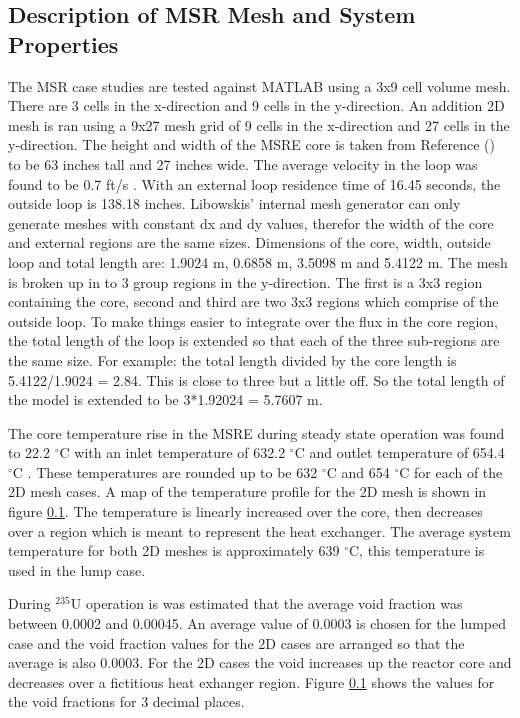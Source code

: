 \subsection{Description of MSR Mesh and System Properties}
The MSR case studies are tested against MATLAB using a 3x9 cell volume mesh. There are 3 cells in the x-direction and 9 cells in the y-direction. An addition 2D mesh is ran using a 9x27 mesh grid of 9 cells in the x-direction and 27 cells in the y-direction. The height and width of the MSRE core is taken from Reference (\cite{haubenreich1964}) to be 63 inches tall and 27 inches wide. The average velocity in the loop was found to be 0.7 ft/s \cite{kedl1972}. With an external loop residence time of 16.45 seconds, the outside loop is 138.18 inches. Libowskis' internal mesh generator can only generate meshes with constant dx and dy values, therefor the width of the core and external regions are the same sizes. Dimensions of the core, width, outside loop and total length are: 1.9024 m, 0.6858 m, 3.5098 m and 5.4122 m. The mesh is broken up in to 3 group regions in the y-direction. The first is a 3x3 region containing the core, second and third are two 3x3 regions which comprise of the outside loop. To make things easier to integrate over the flux in the core region, the total length of the loop is extended so that each of the three sub-regions are the same size. For example: the total length divided by the core length is 5.4122/1.9024 = 2.84. This is close to three but a little off. So the total length of the model is extended to be 3*1.92024 = 5.7607 m. 

The core temperature rise in the MSRE during steady state operation was found to 22.2 $^{\circ}$C with an inlet temperature of 632.2 $^{\circ}$C and outlet temperature of 654.4 $^{\circ}$C \cite{engel1962}. These temperatures are rounded up to be 632 $^{\circ}$C and 654 $^{\circ}$C for each of the 2D mesh cases. A map of the temperature profile for the 2D mesh is shown in figure \ref{}. The temperature is linearly increased over the core, then decreases over a region which is meant to represent the heat exchanger. The average system temperature for both 2D meshes is approximately 639 $^{\circ}$C, this temperature is used in the lump case. 

During $^{235}$U operation is was estimated that the average void fraction was between 0.0002 and 0.00045. An average value of 0.0003 is chosen for the lumped case and the void fraction values for the 2D cases are arranged so that the average is also 0.0003. For the 2D cases the void increases up the reactor core and decreases over a fictitious heat exhanger region. Figure \ref{} shows the values for the void fractions for 3 decimal places.  

